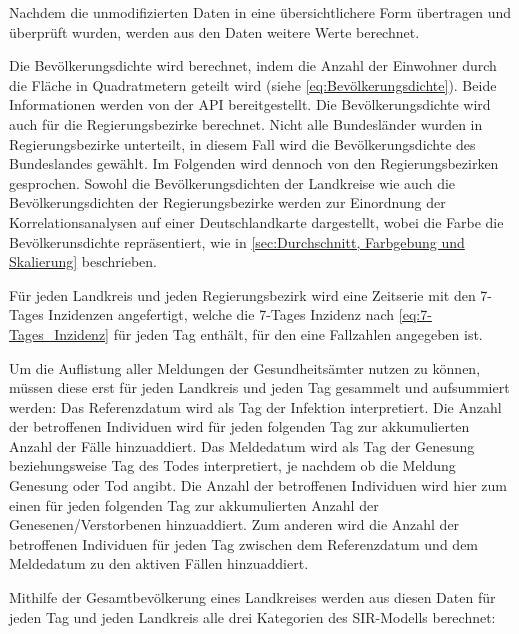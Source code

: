 Nachdem die unmodifizierten Daten in eine übersichtlichere Form übertragen und überprüft wurden, werden aus den Daten weitere Werte berechnet.

Die Bevölkerungsdichte wird berechnet, indem die Anzahl der Einwohner durch die Fläche in Quadratmetern geteilt wird (siehe \autoref{eq:Bevölkerungsdichte}). Beide Informationen werden von der API bereitgestellt.
Die Bevölkerungsdichte wird auch für die Regierungsbezirke berechnet. Nicht alle Bundesländer wurden in Regierungsbezirke unterteilt, in diesem Fall wird die Bevölkerungsdichte des Bundeslandes gewählt. Im Folgenden wird dennoch von \glqq{}den Regierungsbezirken\grqq{} gesprochen.
Sowohl die Bevölkerungsdichten der Landkreise wie auch die Bevölkerungsdichten der Regierungsbezirke werden zur Einordnung der Korrelationsanalysen auf einer Deutschlandkarte dargestellt, wobei die Farbe die Bevölkerunsdichte repräsentiert, wie in \autoref{sec:Durchschnitt, Farbgebung und Skalierung} beschrieben.

Für jeden Landkreis und jeden Regierungsbezirk wird eine Zeitserie mit den 7-Tages Inzidenzen angefertigt, welche die 7-Tages Inzidenz nach \autoref{eq:7-Tages_Inzidenz} für jeden Tag enthält, für den eine Fallzahlen angegeben ist. 

Um die Auflistung aller Meldungen der Gesundheitsämter nutzen zu können, müssen diese erst für jeden Landkreis und jeden Tag gesammelt und aufsummiert werden:
Das Referenzdatum wird als Tag der Infektion interpretiert. Die Anzahl der betroffenen Individuen wird für jeden folgenden Tag zur akkumulierten Anzahl der Fälle hinzuaddiert.
Das Meldedatum wird als Tag der Genesung beziehungsweise Tag des Todes interpretiert, je nachdem ob die Meldung Genesung oder Tod angibt. Die Anzahl der betroffenen Individuen wird hier zum einen für jeden folgenden Tag zur akkumulierten Anzahl der Genesenen/Verstorbenen hinzuaddiert. Zum anderen wird die Anzahl der betroffenen Individuen für jeden Tag zwischen dem Referenzdatum und dem Meldedatum zu den aktiven Fällen hinzuaddiert.

Mithilfe der Gesamtbevölkerung eines Landkreises werden aus diesen Daten für jeden Tag und jeden Landkreis alle drei Kategorien des SIR-Modells berechnet:

